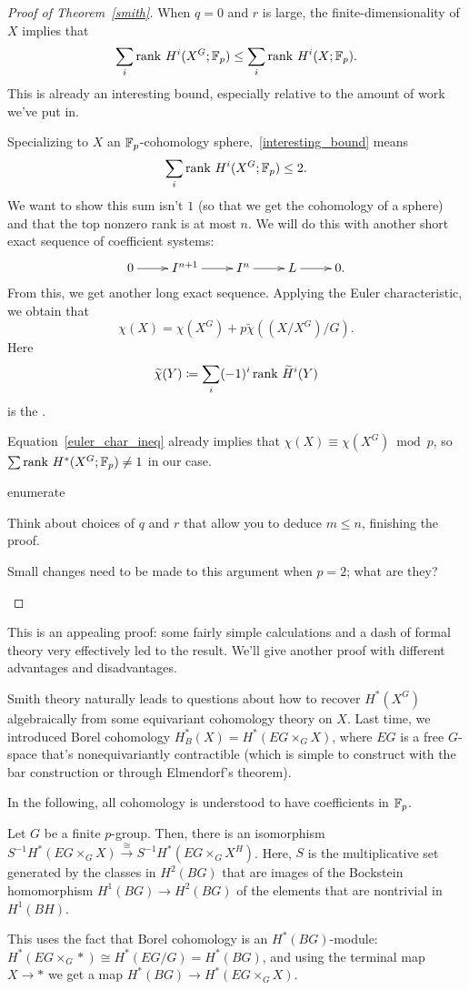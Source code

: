 \begin{proof}[Proof of Theorem~\ref{smith}]
When $q = 0$ and $r$ is large, the finite-dimensionality of $X$ implies that
\begin{equation}
\label{interesting_bound}
\sum_i\operatorname{rank\,} H^i(X^G;\mathbb F_p) \le \sum_i \operatorname{rank\,} H^i(X;\mathbb F_p).
\end{equation}
This is already an interesting bound, especially relative to the amount of work we've put in.

Specializing to $X$ an $\mathbb F_p$-cohomology sphere,~\eqref{interesting_bound} means
\[\sum_i \operatorname{rank\,} H^i(X^G;\mathbb F_p) \le 2.\]
We want to show this sum isn't $1$ (so that we get the cohomology of a sphere) and that the top nonzero rank is at
most $n$. We will do this with another short exact sequence of coefficient systems:
\[\shortexact{I^{n+1}}{I^n}{L}.\]
From this, we get another long exact sequence. Applying the Euler characteristic, we obtain that
\begin{equation}
\label{euler_char_ineq}
\chi(X) = \chi(X^G) + p\widetilde\chi((X/X^G)/G).
\end{equation}
Here
\[\widetilde\chi(Y)\coloneqq \sum_i (-1)^i\operatorname{rank\,} \widetilde H^i(Y)\]
is the .

Equation~\ref{euler_char_ineq} already implies that $\chi(X) \equiv \chi(X^G)\bmod p$, so $\sum\operatorname{rank\,}
H^*(X^G;\mathbb F_p)\ne 1$ in our case.
\begin{comp}{ex}{enumerate}
	\item Think about choices of $q$ and $r$ that allow you to deduce $m\le n$, finishing the proof.
	\item Small changes need to be made to this argument when $p = 2$; what are they?\qedhere
\end{comp}
\end{proof}
This is an appealing proof: some fairly simple calculations and a dash of formal theory very effectively led to the
result. We'll give another proof with different advantages and disadvantages.

Smith theory naturally leads to questions about how to recover $H^*(X^G)$ algebraically from some equivariant
cohomology theory on $X$. Last time, we introduced Borel cohomology $H_B^*(X) = H^*(EG\times_G X)$, where $EG$ is a
free $G$-space that's nonequivariantly contractible (which is simple to construct with the bar construction or
through Elmendorf's theorem).

In the following, all cohomology is understood to have coefficients in $\mathbb F_p$.
\begin{thm}
\label{localization}
Let $G$ be a finite $p$-group. Then, there is an isomorphism $S^{-1}H^*(EG\times_G X)\stackrel\cong\to
S^{-1}H^*(EG\times_G X^H)$. Here, $S$ is the multiplicative set generated by the classes in $H^2(BG)$ that are
images of the Bockstein homomorphism $H^1(BG)\to H^2(BG)$ of the elements that are nontrivial in $H^1(BH)$.
\end{thm}
This uses the fact that Borel cohomology is an $H^*(BG)$-module: $H^*(EG\times_G *) \cong H^*(EG/G) = H^*(BG)$, and
using the terminal map $X\to *$ we get a map $H^*(BG)\to H^*(EG\times_G X)$.


